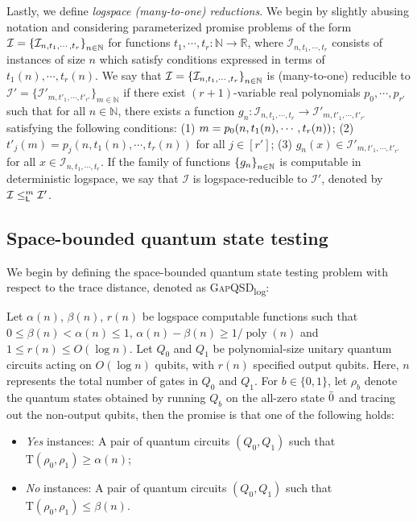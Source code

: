 \documentclass[11pt, a4paper]{article}
\numberwithin{equation}{section}
\numberwithin{figure}{section}
\newcommand{\Lspace}{\textnormal{\textsf{L}}\xspace}
\newcommand{\GapQSDlog}{\texorpdfstring{\textnormal{\textsc{GapQSD}\textsubscript{log}}}\xspace}
\DeclarePairedDelimiter\rbra{\lparen}{\rparen}
\DeclarePairedDelimiter\cbra{\{}{\}}
\let\ket\relax\DeclarePairedDelimiter\ket{\lvert}{\rangle}
\newcommand{\td}{\mathrm{T}}
\newcommand{\binset}{\{0,1\}}
\DeclareMathOperator\poly{poly}
\newcommand{\bbR}{\mathbb{R}}
\newcommand{\bbN}{\mathbb{N}}
\newcommand{\calI}{\mathcal{I}}
\begin{document}
Lastly, we define \textit{logspace \emph{(}many-to-one\emph{)} reductions}. We begin by slightly abusing notation and considering parameterized promise problems of the form $\calI = \cbra*{\calI_{n,t_1,\cdots,t_r}}_{n \in \bbN}$ for functions $t_1,\cdots,t_r \colon \bbN \rightarrow \bbR$, where $\calI_{n,t_1,\cdots,t_r}$ consists of instances of size $n$ which satisfy conditions expressed in terms of $t_1(n),\cdots,t_r(n)$. 
We say that $\calI = \cbra*{\calI_{n,t_1,\cdots,t_r}}_{n \in \bbN}$ is (many-to-one) reducible to $\calI' = \big\{\calI'_{m,t'_1,\cdots,t'_{r'}}\big\}_{m \in \bbN}$ if there exist $(r+1)$-variable real polynomials $p_0, \cdots, p_{r'}$ such that for all $n\in \bbN$, there exists a function $g_n \colon \calI_{n,t_1,\cdots,t_r} \rightarrow \calI'_{m,t'_1,\cdots,t'_{r'}}$ satisfying the following conditions: (1) $m = p_0\rbra*{n, t_1(n), \cdots, t_r(n)}$; (2) $t'_j(m) = p_j(n,t_1(n),\cdots, t_r(n))$ for all $j \in [r']$; (3) $g_n(x) \in \calI'_{m,t'_1,\cdots,t'_{r'}}$ for all $x \in \calI_{n,t_1,\cdots,t_r}$. If the family of functions $\cbra*{g_n}_{n\in \bbN}$ is computable in deterministic logspace, we say that $\calI$ is logspace-reducible to $\calI'$, denoted by $\calI \leq^m_{\Lspace} \calI'$. 

\subsection{Space-bounded quantum state testing}
\label{subsec:space-bounded-state-testing}

We begin by defining the space-bounded quantum state testing problem with respect to the trace distance, denoted as \GapQSDlog{}:

\begin{definition}
    \label{def:GapQSDlog}
    Let $\alpha(n)$, $\beta(n)$, $r(n)$ be logspace computable functions such that $0 \leq \beta(n) < \alpha(n) \leq 1$, $\alpha(n)-\beta(n) \geq 1/\!\poly(n)$ and $1 \leq r(n) \leq O(\log n)$. Let $Q_0$ and $Q_1$ be polynomial-size unitary quantum circuits acting on $O(\log n)$ qubits, with $r(n)$ specified output qubits. Here, $n$ represents the total number of gates in $Q_0$ and $Q_1$. For $b\in\binset$, let $\rho_b$ denote the quantum states obtained by running $Q_b$ on the all-zero state $\ket{\bar{0}}$ and tracing out the non-output qubits, then the promise is that one of the following holds:    
    \begin{itemize}[itemsep=0.33em,topsep=0.33em,parsep=0.33em]
        \item \emph{Yes} instances: A pair of quantum circuits $(Q_0,Q_1)$ such that $\td(\rho_0,\rho_1) \geq \alpha(n)$;
        \item \emph{No} instances: A pair of quantum circuits $(Q_0,Q_1)$ such that $\td(\rho_0,\rho_1) \leq \beta(n)$. 
    \end{itemize}
\end{definition}
\end{document}
